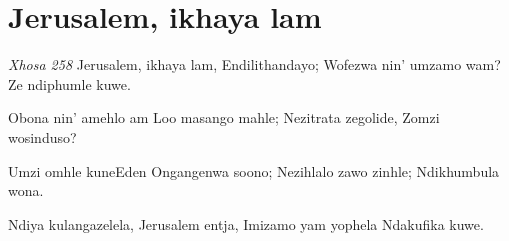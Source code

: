 \starttocol
\chapter{Jerusalem, ikhaya lam}
\nexttocol
\hfill{\it Xhosa 258}
\stoptocol
\starttocol
\startlines
{\sc Jerusalem}, ikhaya lam,
Endilithandayo;
Wofezwa nin' umzamo wam?
Ze ndiphumle kuwe.

Obona nin' amehlo am
Loo masango mahle;
Nezitrata zegolide,
Zomzi wosinduso?

Umzi omhle kuneEden
Ongangenwa soono;
Nezihlalo zawo zinhle;
Ndikhumbula wona.

Ndiya kulangazelela,
Jerusalem entja,
Imizamo yam yophela
Ndakufika kuwe.
\stoplines
\nexttocol

\stoptocol

